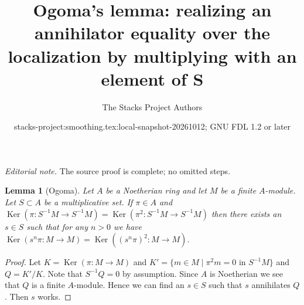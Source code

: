 \documentclass{stacks-project}
\title{Ogoma's lemma: realizing an annihilator equality over the localization by multiplying with an element of S}
\author{The Stacks Project Authors}
\date{stacks-project:smoothing.tex:local-snapshot-20261012; GNU FDL 1.2 or later}
\theoremstyle{plain}
\newtheorem{lemma}[subsection]{Lemma}
\theoremstyle{definition}
\theoremstyle{remark}
\numberwithin{equation}{subsection}
\def\Ker{\mathop{\mathrm{Ker}}}
\begin{document}
\maketitle
\noindent\textit{Editorial note.} The source proof is complete; no omitted steps.\par\medskip
\begin{lemma}[Ogoma]
\label{lemma-ogoma}
Let $A$ be a Noetherian ring and let $M$ be a finite $A$-module.
Let $S \subset A$ be a multiplicative set. If $\pi \in A$ and
$\Ker(\pi : S^{-1}M \to S^{-1}M) =
\Ker(\pi^2 : S^{-1}M \to S^{-1}M)$
then there exists an $s \in S$ such that for any $n > 0$ we have
$\Ker(s^n\pi : M \to M) = \Ker((s^n\pi)^2 : M \to M)$.
\end{lemma}

\begin{proof}
Let $K = \Ker(\pi : M \to M)$ and
$K' = \{m \in M \mid \pi^2 m = 0\text{ in }S^{-1}M\}$ and
$Q = K'/K$. Note that $S^{-1}Q = 0$ by assumption. Since $A$
is Noetherian we see that $Q$ is a finite $A$-module.
Hence we can find an $s \in S$ such that $s$ annihilates $Q$.
Then $s$ works.
\end{proof}
\end{document}
